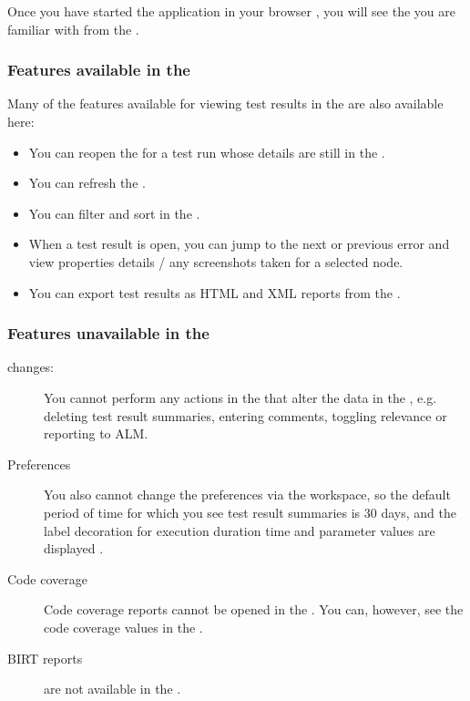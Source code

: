 Once you have started the \dash{} application in your browser , you will see the \reportpersp{} you are familiar with from the \ite{} .

\subsubsection{Features available in the \dash{}}
Many of the features available for viewing test results in the \ite{} are also available here:
\begin{itemize}
\item You can reopen the \gdtestresultview{}  for a test run whose details are still in the \gddb{} .
\item You can refresh the \gdtestsummaryview{} .
\item You can filter and sort in the \gdtestsummaryview{} .
\item When a test result is open, you can jump to the next or previous error  and view properties details / any screenshots taken for a selected node. 
\item You can export test results as HTML and XML reports from the \dash{}. 
\end{itemize}

\subsubsection{Features unavailable in the \dash}
\begin{description}
\item [\gddb{} changes:]{You cannot perform any actions in the \dash{} that alter the data in the \gddb{}, e.g. deleting test result summaries, entering comments, toggling relevance or reporting to ALM.}
\item[Preferences]{You also cannot change the preferences via the workspace, so the default period of time for which you see test result summaries is 30 days, and the label decoration for execution duration time and parameter values are displayed .}
\item [Code coverage]{Code coverage reports cannot be opened in the \dash{}. You can, however, see the code coverage values in the \gdtestsummaryview{}.}
\item [BIRT reports]{ are not available in the \dash{}.}
\end{description}

